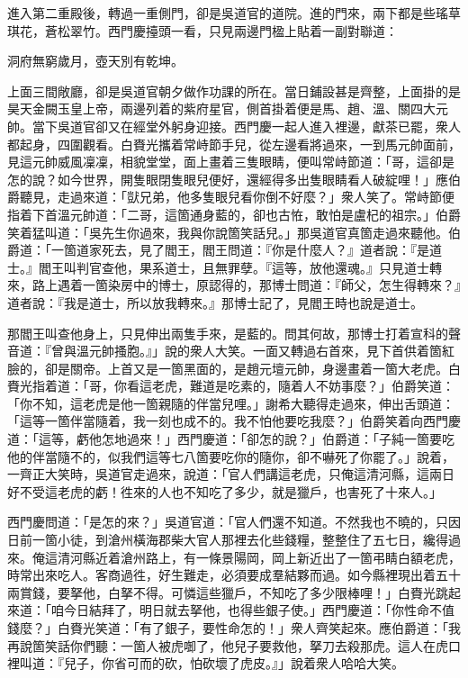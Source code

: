 進入第二重殿後，轉過一重側門，卻是吳道官的道院。進的門來，兩下都是些瑤草琪花，蒼松翠竹。西門慶擡頭一看，只見兩邊門楹上貼着一副對聯道：

\begin{myquote}
洞府無窮歲月，壺天別有乾坤。
\end{myquote}

上面三間敞廳，卻是吳道官朝夕做作功課的所在。當日鋪設甚是齊整，上面掛的是昊天金闕玉皇上帝，兩邊列着的紫府星官，側首掛着便是馬、趙、溫、關四大元帥。{}當下吳道官卻又在經堂外躬身迎接。西門慶一起人進入裡邊，獻茶已罷，衆人都起身，四圍觀看。白賚光攜着常峙節手兒，從左邊看將過來，一到馬元帥面前，見這元帥威風凜凜，相貌堂堂，面上畫着三隻眼睛，便叫常峙節道：「哥，這卻是怎的說？如今世界，開隻眼閉隻眼兒便好，還經得多出隻眼睛看人破綻哩！」應伯爵聽見，走過來道：「獃兄弟，他多隻眼兒看你倒不好麼？」{}衆人笑了。常峙節便指着下首溫元帥道：「二哥，這箇通身藍的，卻也古恠，敢怕是盧杞的祖宗。」伯爵笑着猛叫道：「吳先生你過來，我與你說箇笑話兒。」那吳道官真箇走過來聽他。伯爵道：「一箇道家死去，見了閻王，閻王問道：『你是什麼人？』道者說：『是道士。』閻王叫判官查他，果系道士，且無罪孽。『這等，放他還魂。』只見道士轉來，路上遇着一箇染房中的博士，原認得的，那博士問道：『師父，怎生得轉來？』道者說：『我是道士，所以放我轉來。』那博士記了，見閻王時也說是道士。

那閻王叫查他身上，只見伸出兩隻手來，是藍的。問其何故，那博士打着宣科的聲音道：『曾與溫元帥搔胞。』」說的衆人大笑。一面又轉過右首來，見下首供着箇紅臉的，卻是關帝。上首又是一箇黑面的，是趙元壇元帥，身邊畫着一箇大老虎。白賚光指着道：「哥，你看這老虎，難道是吃素的，隨着人不妨事麼？」伯爵笑道：「你不知，這老虎是他一箇親隨的伴當兒哩。」謝希大聽得走過來，伸出舌頭道：「這等一箇伴當隨着，我一刻也成不的。我不怕他要吃我麼？」伯爵笑着向西門慶道：「這等，虧他怎地過來！」西門慶道：「卻怎的說？」伯爵道：「子純一箇要吃他的伴當隨不的，似我們這等七八箇要吃你的隨你，卻不嚇死了你罷了。」{}說着，一齊正大笑時，吳道官走過來，說道：「官人們講這老虎，{}只俺這清河縣，這兩日好不受這老虎的虧！徃來的人也不知吃了多少，就是獵戶，也害死了十來人。」

西門慶問道：「是怎的來？」吳道官道：「官人們還不知道。不然我也不曉的，只因日前一箇小徒，到滄州橫海郡柴大官人那裡去化些錢糧，{}整整住了五七日，纔得過來。俺這清河縣近着滄州路上，有一條景陽岡，岡上新近出了一箇弔睛白額老虎，時常出來吃人。客商過徃，好生難走，必須要成羣結夥而過。如今縣裡現出着五十兩賞錢，要拏他，白拏不得。可憐這些獵戶，不知吃了多少限棒哩！」白賚光跳起來道：「咱今日結拜了，明日就去拏他，也得些銀子使。」西門慶道：「你性命不值錢麼？」白賚光笑道：「有了銀子，要性命怎的！」衆人齊笑起來。應伯爵道：「我再說箇笑話你們聽：一箇人被虎啣了，他兒子要救他，拏刀去殺那虎。這人在虎口裡叫道：『兒子，你省可而的砍，怕砍壞了虎皮。』」{}說着衆人哈哈大笑。

